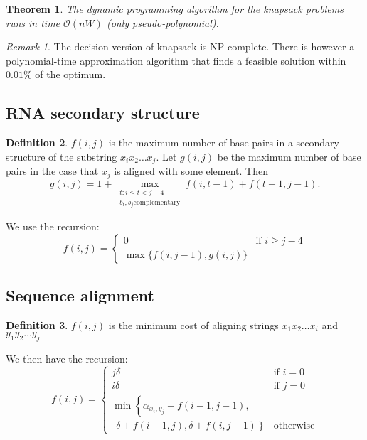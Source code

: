 \documentclass[10pt, oneside, reqno]{amsart}
\theoremstyle{plain}%
\newtheorem{thm}{Theorem}[section]
\theoremstyle{definition}
\newtheorem{defn}[thm]{Definition}
\theoremstyle{remark}
\newtheorem*{rem}{Remark}
\newcommand{\bigo}[1]{\mathcal{O}(#1)}
\begin{document}
\begin{thm}
    The dynamic programming algorithm for the knapsack problems runs in time $\bigo{nW}$ (only pseudo-polynomial).
\end{thm}

\begin{rem}
The decision version of knapsack is NP-complete. There is however a polynomial-time approximation algorithm that finds a feasible solution within $0.01\%$ of the optimum.
\end{rem}

\subsection{RNA secondary structure} %
\label{sub:}

\begin{defn}
    $f(i,j)$ is the maximum number of base pairs in a secondary structure of the substring $x_i x_2\dots x_j$. Let $g(i, j)$ be the maximum number of base pairs in the case that $x_j$ is aligned with some element. Then $$g(i, j) = 1 + \max_{\substack{t:i \leq t < j-4 \\ b_t, b_j \text{complementary}}} f(i,t-1) + f(t+1, j-1).$$
\end{defn}

We use the recursion:
\[
    f(i,j) = \begin{cases}
        0 &\text{if $i \geq j-4$}\\
        \max \{f(i,j-1), g(i, j) \}
    \end{cases}
\]




\subsection{Sequence alignment} %
\label{sub:sequence_alignment}

\begin{defn}
    $f(i,j)$ is the minimum cost of aligning strings $x_1 x_2\dots x_i$ and $y_1 y_2 \dots y_j$
\end{defn}

We then have the recursion:
\[
    f(i,j) = \begin{cases}
        j \delta        &\text{if $i = 0$}\\
        i \delta        &\text{if $j = 0$}\\
        \min \left\{ \alpha_{x_i,y_j} + f(i-1,j-1), \right. & \\
        \ \ \left. \delta + f(i-1,j), \delta + f(i,j-1) \right\} &\text{otherwise} %
    \end{cases}
\]
\end{document}
